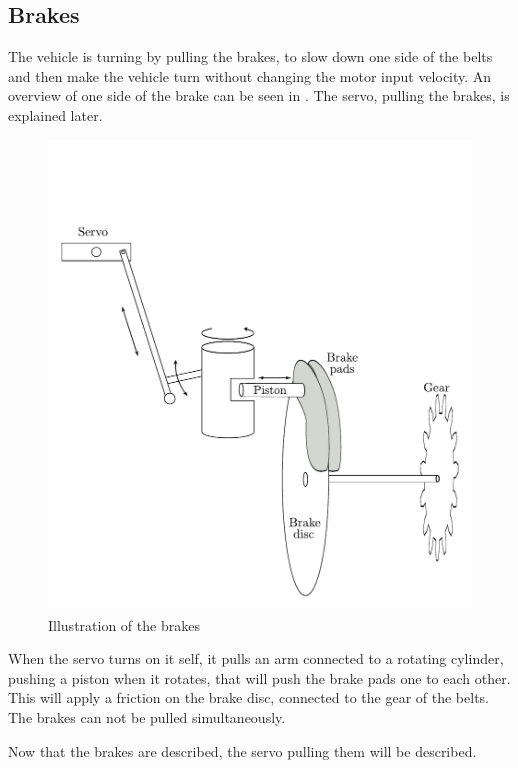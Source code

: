 \subsection{Brakes}

The vehicle is turning by pulling the brakes, to slow down one side of the belts and then make the vehicle turn without changing the motor input velocity. An overview of one side of the brake can be seen in . The servo, pulling the brakes, is explained later.

 \begin{figure}[H]
	\centering
	\includegraphics[scale=0.6]{figures/brakeDescription.pdf}
	\caption{Illustration of the brakes}
	\label{Brakes}
\end{figure}

When the servo turns on it self, it pulls an arm connected to a rotating cylinder, pushing a piston when it rotates, that will push the brake pads one to each other. This will apply a friction on the brake disc, connected to the gear of the belts. The brakes can not be pulled simultaneously.

Now that the brakes are described, the servo pulling them will be described.
